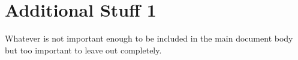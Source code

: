 \chapter{Additional Stuff 1}
\label{app:stuff1}

Whatever is not important enough to be included in the main document body but too important to leave out completely.
